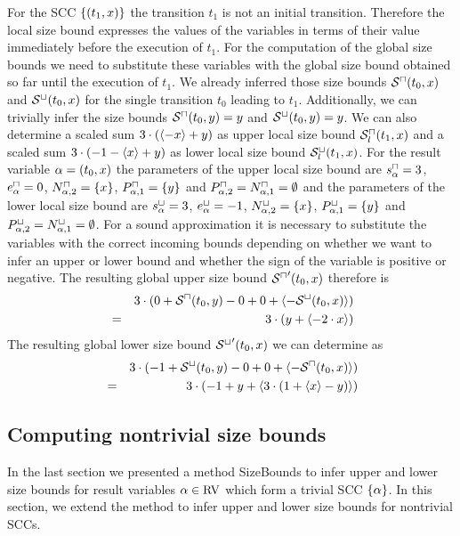 For the SCC $\lbrace (t_1,x) \rbrace$ the transition $t_1$ is not an initial transition.
Therefore the local size bound expresses the values of the variables in terms of their value immediately before the execution of $t_1$.
For the computation of the global size bounds we need to substitute these variables with the global size bound obtained so far until the execution of $t_1$.
We already inferred those size bounds ${\mathcal{S}^\sqcap}(t_0,x)$ and ${\mathcal{S}^\sqcup}(t_0,x)$ for the single transition $t_0$ leading to $t_1$.
Additionally, we can trivially infer the size bounds ${\mathcal{S}^\sqcap}(t_0,y) = y$ and ${\mathcal{S}^\sqcup}(t_0,y) = y$.
We can also determine a scaled sum $3 \cdot (\langle-x\rangle + y)$ as upper local size bound ${\mathcal{S}^\sqcap_l}(t_1,x)$ and a scaled sum $3 \cdot (-1 - \langle x\rangle + y)$ as lower local size bound ${\mathcal{S}^\sqcup_l}(t_1,x)$.
For the result variable $\alpha = (t_0,x)$ the parameters of the upper local size bound are $s^\sqcap_\alpha = 3$, $e^\sqcap_\alpha = 0$, $N^\sqcap_{\alpha,2} = \lbrace x \rbrace$, $P^\sqcap_{\alpha,1} = \lbrace y \rbrace$ and $P^\sqcap_{\alpha,2} = N^\sqcap_{\alpha,1} = \emptyset$ and the parameters of the lower local size bound are $s^\sqcup_\alpha = 3$, $e^\sqcup_\alpha = -1$, $N^\sqcup_{\alpha,2} = \lbrace x \rbrace$, $P^\sqcup_{\alpha,1} = \lbrace y \rbrace$ and $P^\sqcup_{\alpha,2} = N^\sqcup_{\alpha,1} = \emptyset$.
For a sound approximation it is necessary to substitute the variables with the correct incoming bounds depending on whether we want to infer an upper or lower bound and whether the sign of the variable is positive or negative.
The resulting global upper size bound ${\mathcal{S}^\sqcap}'(t_0,x)$ therefore is 
\begin{align*}
  && 3 \cdot ( 0 + {\mathcal{S}^\sqcap}(t_0, y) - 0 + 0 + \langle-{\mathcal{S}^\sqcup}(t_0, x)\rangle ) \\
  & = & 3 \cdot ( y + \langle-2 \cdot x\rangle )
\end{align*}
The resulting global lower size bound ${\mathcal{S}^\sqcup}'(t_0,x)$ we can determine as
\begin{align*}
  && 3 \cdot ( -1 + {\mathcal{S}^\sqcup}(t_0, y) - 0 + 0 + \langle-{\mathcal{S}^\sqcap}(t_0, x)\rangle ) \\
  & = & 3 \cdot ( -1 + y + \langle3 \cdot (1 + \langle x\rangle - y)\rangle )
\end{align*}


\subsection{Computing nontrivial size bounds}

In the last section we presented a method SizeBounds to infer upper and lower size bounds for result variables $\alpha \in \text{RV}$ which form a trivial SCC $\lbrace \alpha \rbrace$.
In this section, we extend the method to infer upper and lower size bounds for nontrivial SCCs.

